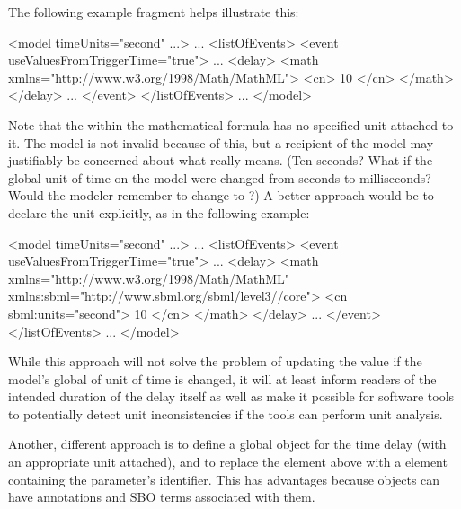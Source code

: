 The following \Event example fragment helps illustrate this:
\label{sec:event:delay:example}

\begin{example}
<model timeUnits="second" ...>
    ...
    <listOfEvents>
        <event useValuesFromTriggerTime="true">
            ...
            <delay>
                <math xmlns="http://www.w3.org/1998/Math/MathML">
                    <cn> 10 </cn>
                </math>
            </delay>
            ...
        </event>
    </listOfEvents>
    ...
</model>
\end{example}

Note that the  within the mathematical formula
has no specified unit attached to it.  The model is not invalid
because of this, but a recipient of the model may justifiably be
concerned about what  really means.  (Ten seconds?  What
if the global unit of time on the model were changed from seconds
to milliseconds?  Would the modeler remember to change  to
?)  A better approach would be to declare the unit
explicitly, as in the following example:

\begin{example}
<model timeUnits="second" ...>
    ...
    <listOfEvents>
        <event useValuesFromTriggerTime="true">
            ...
            <delay>
                <math xmlns="http://www.w3.org/1998/Math/MathML"
                      xmlns:sbml="http://www.sbml.org/sbml/level3/\thisvlc/core">
                    <cn sbml:units="second"> 10 </cn>
                </math>
            </delay>
            ...
        </event>
    </listOfEvents>
    ...
</model>
\end{example}

While this approach will not solve the problem of updating the
value if the model's global of unit of time is changed, it will at
least inform readers of the intended duration of the delay itself
as well as make it possible for software tools to potentially
detect unit inconsistencies if the tools can perform unit
analysis.

Another, different approach is to define a global \Parameter
object for the time delay (with an appropriate unit attached), and
to replace the  element above with a  element
containing the parameter's identifier.  This has advantages
because \Parameter objects can have annotations and SBO terms
associated with them.


\label{sec:delay-id}

